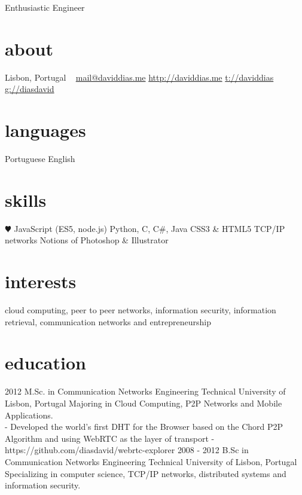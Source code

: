 \documentclass[]{friggeri-cv}
\begin{document}
       {Enthusiastic Engineer}

\begin{aside}
  \section{about}
    Lisbon, Portugal
    ~
    \href{mailto:mail@daviddias.me}{mail@daviddias.me}
    \href{http://daviddias.me}{http://daviddias.me}
    \href{https://twitter.com/daviddias}{t://daviddias}
    \href{https://github.com/diasdavid}{g://diasdavid}
  \section{languages}
    Portuguese
    English
  \section{skills}
    {\color{red} $\varheartsuit$} JavaScript
    (ES5, node.js)
    Python, C, C\#, Java
    CSS3 \& HTML5
    TCP/IP networks
    Notions of Photoshop \& Illustrator
\end{aside}

\section{interests}

cloud computing, peer to peer networks, information security, information retrieval, communication networks and entrepreneurship

\section{education}

\begin{entrylist}
  \entry
    {2012}
    {M.Sc. in Communication Networks Engineering}
    {Technical University of Lisbon, Portugal}
    {Majoring in Cloud Computing, P2P Networks and Mobile Applications. \\
        - Developed the world's first DHT for the Browser based on the Chord P2P Algorithm and using WebRTC as the layer of transport - https://github.com/diasdavid/webrtc-explorer}
  \entry
    {2008 - 2012}
    {B.Sc in Communication Networks Engineering}
    {Technical University of Lisbon, Portugal}
    {Specializing in computer science, TCP/IP networks, distributed systems and information security.}
\end{entrylist}
\end{document}
